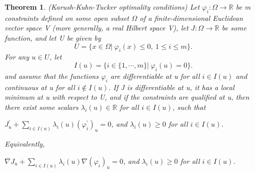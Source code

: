 \documentclass[a4paper,12pt]{report}
\newtheorem{theorem}{Theorem}[section]
\begin{document}
\begin{theorem}
    (Karush-Kuhn-Tucker optimality conditions) Let $\varphi_i:\Omega\to \mathbb R$ be m constraints defined on some open subset $\Omega$ of a finite-dimensional Euclidean vector space V (more generally, a real Hilbert space V), let $J:\Omega\to \mathbb R$ be some function, and let U be given by
    \[
        U=\{x\in\Omega|\ \varphi_i(x)\leq0, \ 1\leq i\leq m\}.
    \]
    For any $u\in U$, let 
    \[
        I(u)=\{i\in\{1,\cdots,m\}|\ \varphi_i(u)=0\}.
    \]
    and assume that the functions $\varphi_i$ are differentiable at u for all $i\in I(u)$ and continuous at u for all $i\notin I(u)$. If J is differentiable at u, it has a local minimum at u with respect to U, and if the constraints are qualified at u, then there exist some scalars $\lambda_i(u)\in\mathbb R$ for all $i\in I(u)$, such that
    \begin{center}
        $J^\prime_u+\sum\limits_{i\in I(u)} \lambda_i(u)(\varphi^\prime_i)_u=0$, and $\lambda_i(u)\geq0$ for all $i\in I(u)$.
    \end{center}
    Equivalently, 
    \begin{center}
        $\nabla J_u+\sum\limits_{i\in I(u)} \lambda_i(u)\nabla(\varphi_i)_u=0$, and $\lambda_i(u)\geq0$ for all $i\in I(u)$.
    \end{center}
\end{theorem}
\end{document}
